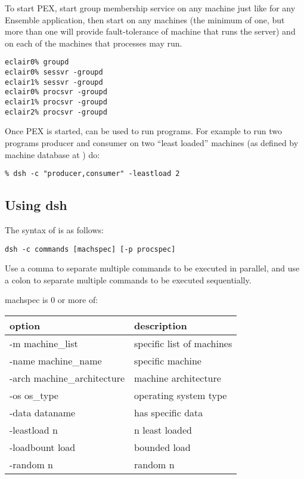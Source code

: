 To start PEX, start group membership service
 on any machine just like for any Ensemble application,
then start  on any machines (the minimum of one, but
more than one will provide fault-tolerance of machine that runs
the server) and  on each of the machines that
processes may run.

\begin{verbatim}
eclair0% groupd
eclair0% sessvr -groupd
eclair1% sessvr -groupd
eclair0% procsvr -groupd
eclair1% procsvr -groupd
eclair2% procsvr -groupd
\end{verbatim}

Once PEX is started,  can be used to run
programs.  For example to run two programs producer and consumer on
two ``least loaded'' machines (as defined by machine database at
) do:
\begin{verbatim}
% dsh -c "producer,consumer" -leastload 2
\end{verbatim}


\subsection{Using dsh}
The syntax of  is as follows:
\begin{verbatim}
dsh -c commands [machspec] [-p procspec]
\end{verbatim}

Use a comma to separate multiple commands to be executed in
parallel, and use a colon to separate multiple commands to
be executed sequentially.

machspec is 0 or more of:
\begin{center}
\begin{tabular}{|l|l|}					   \hline
option			& description			\\ \hline
-m machine\_list	& specific list of machines	\\
-name machine\_name		& specific machine	\\
-arch machine\_architecture	& machine architecture	\\
-os os\_type			& operating system type	\\
-data dataname			& has specific data	\\
-leastload n			& n least loaded	\\
-loadbount load			& bounded load	\\
-random n			& random n	\\ \hline
\end{tabular}
\end{center}


